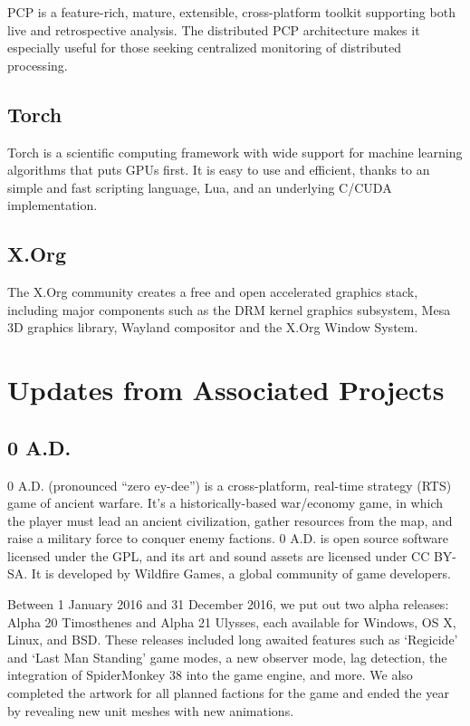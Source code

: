 \documentclass[letterpaper]{report}
\begin{document}
PCP is a feature-rich, mature, extensible, cross-platform toolkit
supporting both live and retrospective analysis. The distributed PCP
architecture makes it especially useful for those seeking centralized
monitoring of distributed processing.

\subsection{Torch}

Torch is a scientific computing framework with wide support for machine
learning algorithms that puts GPUs first. It is easy to use and
efficient, thanks to an simple and fast scripting language, Lua, and an
underlying C/CUDA implementation.

\subsection{X.Org}

The X.Org community creates a free and open accelerated graphics stack,
including major components such as the DRM kernel graphics subsystem,
Mesa 3D graphics library, Wayland compositor and the X.Org Window
System.


\section{Updates from Associated Projects}

\subsection{0 A.D.}

0 A.D. (pronounced ``zero ey-dee'') is a cross-platform, real-time
strategy (RTS) game of ancient warfare. It's a historically-based
war/economy game, in which the player must lead an ancient civilization,
gather resources from the map, and raise a military force to conquer
enemy factions. 0 A.D. is open source software licensed under the GPL,
and its art and sound assets are licensed under CC BY-SA. It is
developed by Wildfire Games, a global community of game developers.

Between 1 January 2016 and 31 December 2016, we put out two alpha
releases: Alpha 20 Timosthenes and Alpha 21 Ulysses, each available for
Windows, OS X, Linux, and BSD. These releases included long awaited
features such as `Regicide' and `Last Man Standing' game modes, a new
observer mode, lag detection, the integration of SpiderMonkey 38 into
the game engine, and more. We also completed the artwork for all planned
factions for the game and ended the year by revealing new unit meshes
with new animations.
\end{document}
